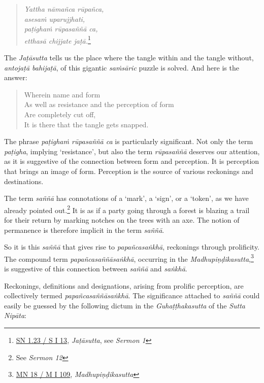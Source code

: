 \begin{quote}
\emph{Yattha nāmañca rūpañca,}\\
\emph{asesaṁ uparujjhati,}\\
\emph{paṭighaṁ rūpasaññā ca,}\\
\emph{etthasā chijjate jaṭā.}\footnote{\href{https://suttacentral.net/sn1.23/pli/ms}{SN 1.23 / S I 13}, \emph{Jaṭāsutta}, see \emph{Sermon 1}}
\end{quote}

\clearpage

The \emph{Jaṭāsutta} tells us the place where the tangle within and the tangle without, \emph{antojaṭā bahijaṭā}, of this gigantic \emph{saṁsāric} puzzle is solved. And here is the answer:

\begin{quote}
Wherein name and form\\
As well as resistance and the perception of form\\
Are completely cut off,\\
It is there that the tangle gets snapped.
\end{quote}

The phrase \emph{paṭighaṁ rūpasaññā ca} is particularly significant. Not only the term \emph{paṭigha}, implying `resistance', but also the term \emph{rūpasaññā} deserves our attention, as it is suggestive of the connection between form and perception. It is perception that brings an image of form. Perception is the source of various reckonings and destinations.

The term \emph{saññā} has connotations of a `mark', a `sign', or a `token', as we have already pointed out.\footnote{See \emph{Sermon 12}} It is as if a party going through a forest is blazing a trail for their return by marking notches on the trees with an axe. The notion of permanence is therefore implicit in the term \emph{saññā}.

So it is this \emph{saññā} that gives rise to \emph{papañcasaṅkhā}, reckonings through prolificity. The compound term \emph{papañcasaññāsaṅkhā}, occurring in the \emph{Madhupiṇḍikasutta},\footnote{\href{https://suttacentral.net/mn18/pli/ms}{MN 18 / M I 109}, \emph{Madhupiṇḍikasutta}} is suggestive of this connection between \emph{saññā} and \emph{saṅkhā}.

Reckonings, definitions and designations, arising from prolific perception, are collectively termed \emph{papañcasaññāsaṅkhā}. The significance attached to \emph{saññā} could easily be guessed by the following dictum in the \emph{Guhaṭṭhakasutta} of the \emph{Sutta Nipāta}:

